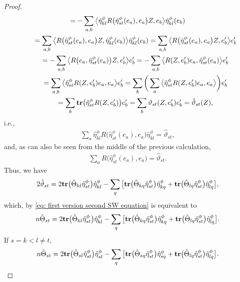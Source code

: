\documentclass[pdftex]{sigma}
\newcommand{\tr}{\mbox{\bf tr}}
\numberwithin{equation}{section}
\begin{document}
\begin{proof}
\begin{gather*}
 = -\sum_{a,b}\big\langle \hat{\eta}^\phi_{kl}{R\big(\hat\eta_{st}^\phi(e_a),e_a\big)}Z,e_b\big\rangle \hat{\eta}^\phi_{kl}(e_b)\\
 \qquad{} = \sum_{a,b}\big\langle {R\big(\hat\eta_{st}^\phi(e_a),e_a\big)}Z,\hat{\eta}^\phi_{kl}(e_b)\big\rangle \hat{\eta}^\phi_{kl}(e_b)
 = \sum_{a,b}\big\langle {R\big(\hat\eta_{st}^\phi(e_a),e_a\big)}Z,e_b'\big\rangle e_b'\\
 \qquad{} = -\sum_{a,b}\big\langle {R\big(e_a,\hat\eta_{st}^\phi(e_a)\big)}Z,e_b'\big\rangle e_b'
 = -\sum_{a,b}\big\langle {R(Z,e_b')}e_a,\hat\eta_{st}^\phi(e_a)\big\rangle e_b'\\
 \qquad{} = \sum_{a,b}\big\langle \hat\eta_{st}^\phi{R(Z,e_b')}e_a,e_a\big\rangle e_b' =
\sum_{b}\bigg(\sum_{a}\big\langle \hat\eta_{st}^\phi{R(Z,e_b')}e_a,e_a\big\rangle \bigg)e_b'\\
 \qquad{} = \sum_{b}\tr\big(\hat\eta_{st}^\phi{R(Z,e_b')}\big)e_b' =\sum_{b}\vartheta_{st}(Z,e_b')e_b' = \hat\vartheta_{st}(Z),
\end{gather*}
i.e.,
\begin{gather*}
\sum_a\hat{\eta}^\phi_{kl}{R\big(\hat\eta_{st}^\phi(e_a),e_a\big)}\hat{\eta}^\phi_{kl} = \hat\vartheta_{st},
\end{gather*}
and, as can also be seen from the middle of the previous calculation,
\begin{gather*}
\sum_a{R\big(\hat\eta_{st}^\phi(e_a),e_a\big)} =\hat\vartheta_{st}.
\end{gather*}
Thus, we have
\begin{gather*}
2\hat\vartheta_{st} =2\tr\big(\hat\Theta_{kl}\hat\eta_{st}^\phi\big)\hat\eta_{kl}^\phi
 -\sum_{q} \big[\tr\big(\hat\Theta_{kq}\hat\eta_{st}^\phi\big) \hat{\eta}^\phi_{kq}
 + \tr\big(\hat\Theta_{lq}\hat\eta_{st}^\phi\big)\hat{\eta}^\phi_{lq}\big],
\end{gather*}
which, by \eqref{eq: first version second SW equation} is equivalent to
\begin{gather*}
n\hat\Theta_{st} =2\tr\big(\hat\Theta_{kl}\hat\eta_{st}^\phi\big)\hat\eta_{kl}^\phi
 -\sum_{q} \big[\tr\big(\hat\Theta_{kq}\hat\eta_{st}^\phi\big) \hat{\eta}^\phi_{kq}
 + \tr\big(\hat\Theta_{lq}\hat\eta_{st}^\phi\big)\hat{\eta}^\phi_{lq}\big] .
\end{gather*}
If $s=k<l\not =t$,
\begin{gather*}
n\hat\Theta_{st} =
2\tr\big(\hat\Theta_{sl}\hat\eta_{st}^\phi\big)\hat\eta_{sl}^\phi
 -\sum_{q} \big[\tr\big(\hat\Theta_{sq}\hat\eta_{st}^\phi\big) \hat{\eta}^\phi_{sq}
 + \tr\big(\hat\Theta_{lq}\hat\eta_{st}^\phi\big)\hat{\eta}^\phi_{lq}\big] .

\end{gather*}
\end{proof}
\end{document}
